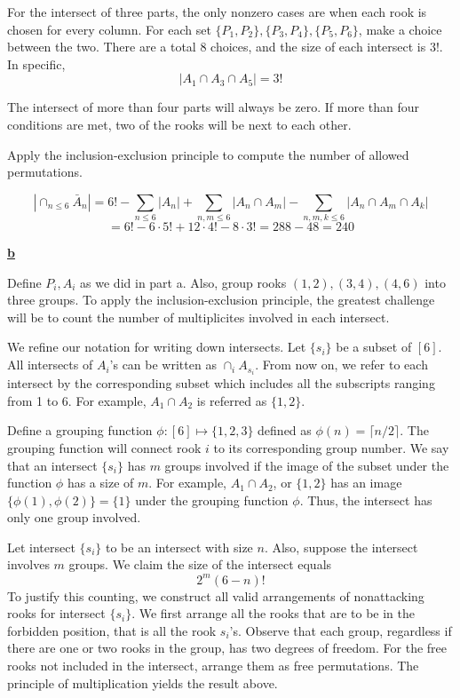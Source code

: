 \documentclass{article}
\newcommand{\new}[1]{
    \vspace{2mm}
    \noindent
    \textbf{
    \underline{#1}}
}
\newcommand{\m}{
    \cdot
}
\begin{document}
For the intersect of three parts, the only nonzero cases 
are when each rook is chosen for every column. For each set 
$\{P_1, P_2\}, \{P_3, P_4\}, \{P_5, P_6\}$, make a choice between the two. 
There are a total 8 choices, and the size of each intersect is 
$3!$. In specific, 
\[
    |A_1 \cap A_3 \cap A_5| = 3!
\]

The intersect of more than four parts will always be zero. 
If more than four conditions are met, two of the rooks will be 
next to each other. 

Apply the inclusion-exclusion principle to compute the number 
of allowed permutations. 

\[
    |\cap_{n \leq 6} \bar{A}_n|
    = 
    6! - 
    \sum_{n\leq 6}|A_n|
    + \sum_{n, m \leq 6} |A_n \cap A_m|
    - \sum_{n, m, k \leq 6} |A_n \cap A_m \cap A_k| 
\]
    \[=
    6! - 6\m5! + 12\m4! - 8 \m 3! 
    = 288 - 48 = \boxed{240}
\]

\new{b} 
Define $P_i, A_i$ as we did in part a. 
Also, group rooks $(1, 2), (3, 4), (4, 6)$ into three groups. 
To apply the inclusion-exclusion principle, the 
greatest challenge will be to count the number 
of multiplicites involved in each intersect. 

We refine our notation for writing down intersects. 
Let $\{s_i\}$ be a subset of $[6]$. All intersects of $A_i$'s 
can be written as $
    \cap_{i} A_{s_i}
$. From now on, we refer to each intersect by the 
corresponding subset which includes all the subscripts 
ranging from 1 to 6. 
For example, $A_1\cap A_2$ is referred as $\{1, 2\}$. 

Define a grouping function $\phi:[6]\mapsto \{1, 2, 3\}$
defined as $\phi(n) = \lceil n/2\rceil$. The grouping function 
will connect rook $i$ to its corresponding group number. 
We say that an intersect $\{s_i\}$ has $m$ groups involved if 
the image of the subset under the function $\phi$ has 
a size of $m$.  For example, $A_1\cap A_2$, or $\{1, 2\}$
has an image $\{\phi(1), \phi(2)\} = \{1\}$ under the grouping function 
$\phi$. Thus, the intersect has only one group involved. 

Let intersect $\{s_i\}$ to be an intersect with size $n$. 
Also, suppose the intersect involves $m$ groups. We claim 
the size of the intersect equals 
\[
    2^m (6 - n)!
\]
To justify this counting, we construct all valid arrangements 
of nonattacking rooks for intersect $\{s_i\}$. We first arrange 
all the rooks that are to be in the forbidden position, that is 
all the rook $s_i$'s. Observe that each group, regardless if 
there are one or two rooks in the group, has two degrees of freedom. 
For the free rooks not included in the intersect, arrange 
them as free permutations. The principle of multiplication 
yields the result above. 
\end{document}
